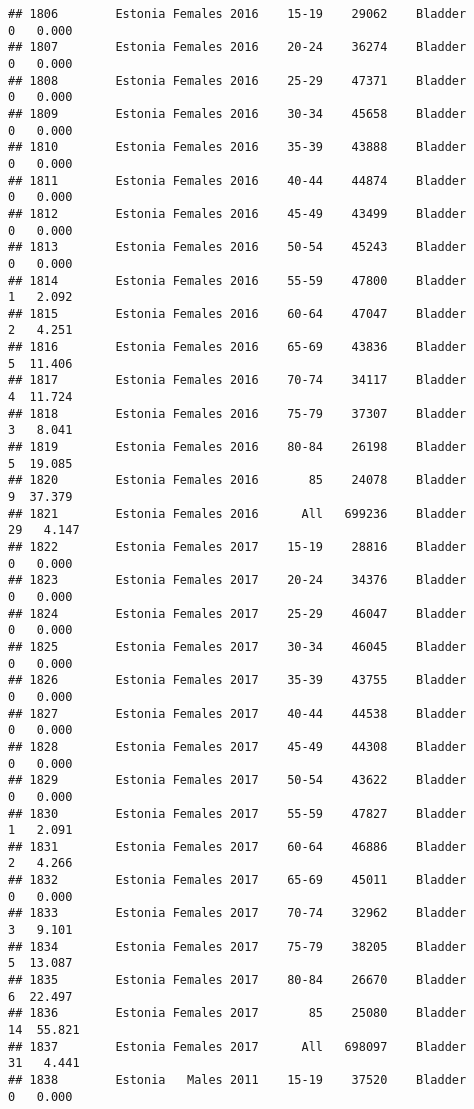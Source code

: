 \documentclass[
]{article}
\begin{document}
\begin{verbatim}
## 1806        Estonia Females 2016    15-19    29062    Bladder      0   0.000
## 1807        Estonia Females 2016    20-24    36274    Bladder      0   0.000
## 1808        Estonia Females 2016    25-29    47371    Bladder      0   0.000
## 1809        Estonia Females 2016    30-34    45658    Bladder      0   0.000
## 1810        Estonia Females 2016    35-39    43888    Bladder      0   0.000
## 1811        Estonia Females 2016    40-44    44874    Bladder      0   0.000
## 1812        Estonia Females 2016    45-49    43499    Bladder      0   0.000
## 1813        Estonia Females 2016    50-54    45243    Bladder      0   0.000
## 1814        Estonia Females 2016    55-59    47800    Bladder      1   2.092
## 1815        Estonia Females 2016    60-64    47047    Bladder      2   4.251
## 1816        Estonia Females 2016    65-69    43836    Bladder      5  11.406
## 1817        Estonia Females 2016    70-74    34117    Bladder      4  11.724
## 1818        Estonia Females 2016    75-79    37307    Bladder      3   8.041
## 1819        Estonia Females 2016    80-84    26198    Bladder      5  19.085
## 1820        Estonia Females 2016       85    24078    Bladder      9  37.379
## 1821        Estonia Females 2016      All   699236    Bladder     29   4.147
## 1822        Estonia Females 2017    15-19    28816    Bladder      0   0.000
## 1823        Estonia Females 2017    20-24    34376    Bladder      0   0.000
## 1824        Estonia Females 2017    25-29    46047    Bladder      0   0.000
## 1825        Estonia Females 2017    30-34    46045    Bladder      0   0.000
## 1826        Estonia Females 2017    35-39    43755    Bladder      0   0.000
## 1827        Estonia Females 2017    40-44    44538    Bladder      0   0.000
## 1828        Estonia Females 2017    45-49    44308    Bladder      0   0.000
## 1829        Estonia Females 2017    50-54    43622    Bladder      0   0.000
## 1830        Estonia Females 2017    55-59    47827    Bladder      1   2.091
## 1831        Estonia Females 2017    60-64    46886    Bladder      2   4.266
## 1832        Estonia Females 2017    65-69    45011    Bladder      0   0.000
## 1833        Estonia Females 2017    70-74    32962    Bladder      3   9.101
## 1834        Estonia Females 2017    75-79    38205    Bladder      5  13.087
## 1835        Estonia Females 2017    80-84    26670    Bladder      6  22.497
## 1836        Estonia Females 2017       85    25080    Bladder     14  55.821
## 1837        Estonia Females 2017      All   698097    Bladder     31   4.441
## 1838        Estonia   Males 2011    15-19    37520    Bladder      0   0.000

\end{verbatim}
\end{document}
